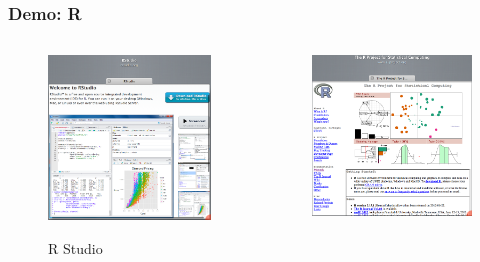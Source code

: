 \documentclass[hyperref={colorlinks=false},compress,handout,10pt]{beamer}
\begin{document}
\begin{frame}[fragile]
    \frametitle{Demo: R}
    \begin{columns}
        \begin{column}{0.5\textwidth}
            \begin{figure}
                \centering
            \href{http://rstudio.org}{
            \includegraphics[width=\textwidth]{images/Rstudio}
            }
            \caption{R Studio}
        \end{figure}
        \end{column}
        \begin{column}{0.5\textwidth}
            \begin{figure}
                \centering
                    \href{http://www.r-project.org}{
                        \includegraphics[width=\textwidth]{images/Rproject}}

\end{figure}
\end{column}
\end{columns}
\end{frame}
\end{document}
